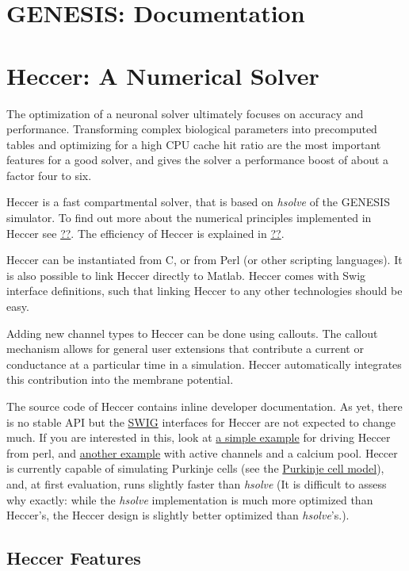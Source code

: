 \documentclass[12pt]{article}
\begin{document}
\section*{GENESIS: Documentation}

\section*{Heccer: A Numerical Solver}

The optimization of a neuronal solver ultimately focuses on accuracy and performance. Transforming complex biological parameters into precomputed tables and optimizing for a high CPU cache hit ratio are the most important features for a good solver, and gives the solver a performance boost of about a factor four to six.

Heccer is a fast compartmental solver, that is based on {\it hsolve} of the GENESIS simulator. To find out more about the numerical principles implemented in Heccer see \href{}{??}. The efficiency of Heccer is explained in \href{}{??}.

Heccer can be instantiated from C, or from Perl (or other scripting languages). It is also possible to link Heccer directly to Matlab. Heccer comes with Swig interface definitions, such that linking Heccer to any other technologies should be easy.

Adding new channel types to Heccer can be done using callouts. The callout mechanism allows for general user extensions that contribute a current or conductance at a particular time in a simulation. Heccer automatically integrates this contribution into the membrane potential.

The source code of Heccer contains inline developer documentation. As yet, there is no stable API but the \href{http://www.swig.org/}{SWIG} interfaces for Heccer are not expected to change much. If you are interested in this, look at \href{}{a simple example} for driving Heccer from perl, and \href{}{another example} with active channels and a calcium pool. Heccer is currently capable of simulating Purkinje cells (see the \href{../purkinje-cell-model/purkinje-cell-model.pdf}{Purkinje cell model}), and, at first evaluation, runs slightly faster than {\it hsolve} (It is difficult to assess why exactly: while the {\it hsolve} implementation is much more optimized than Heccer's, the Heccer design is slightly better optimized than {\it hsolve}'s.).

\subsection*{Heccer Features}
\end{document}
